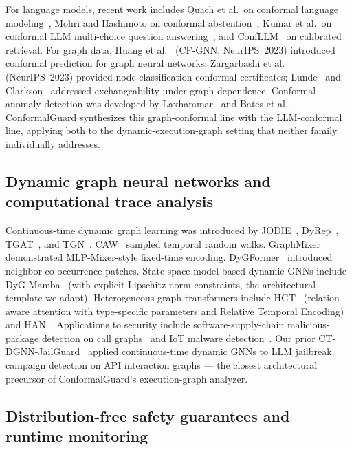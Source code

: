 \documentclass[12pt,a4paper]{article}
\theoremstyle{definition}
\theoremstyle{remark}
\newcommand{\modelname}{ConformalGuard}
\begin{document}
For language models, recent work includes Quach et al.\ on conformal language modeling~\cite{quach2024conformal}, Mohri and Hashimoto on conformal abstention~\cite{mohri2024conformal}, Kumar et al.\ on conformal LLM multi-choice question answering~\cite{kumar2023conformal}, and ConfLLM~\cite{huang2024confllm} on calibrated retrieval. For graph data, Huang et al.~\cite{huang2023cfgnn} (CF-GNN, NeurIPS~2023) introduced conformal prediction for graph neural networks; Zargarbashi et al.~\cite{zargarbashi2023conformal} (NeurIPS~2023) provided node-classification conformal certificates; Lunde~\cite{lunde2023conformal} and Clarkson~\cite{clarkson2023distribution} addressed exchangeability under graph dependence. Conformal anomaly detection was developed by Laxhammar~\cite{laxhammar2014conformal} and Bates et al.~\cite{bates2023testing}. \modelname{} synthesizes this graph-conformal line with the LLM-conformal line, applying both to the dynamic-execution-graph setting that neither family individually addresses.

\subsection{Dynamic graph neural networks and computational trace analysis}

Continuous-time dynamic graph learning was introduced by JODIE~\cite{kumar2019jodie}, DyRep~\cite{trivedi2019dyrep}, TGAT~\cite{xu2020tgat}, and TGN~\cite{rossi2020tgn}. CAW~\cite{wang2021caw} sampled temporal random walks. GraphMixer~\cite{cong2023graphmixer} demonstrated MLP-Mixer-style fixed-time encoding. DyGFormer~\cite{yu2023dygformer} introduced neighbor co-occurrence patches. State-space-model-based dynamic GNNs include DyG-Mamba~\cite{li2025dygmamba} (with explicit Lipschitz-norm constraints, the architectural template we adapt). Heterogeneous graph transformers include HGT~\cite{hu2020hgt} (relation-aware attention with type-specific parameters and Relative Temporal Encoding) and HAN~\cite{wang2019han}. Applications to security include software-supply-chain malicious-package detection on call graphs~\cite{sejfia2022amalfi,zhang2024spiderscan} and IoT malware detection~\cite{amjath2025fedmalgnn}. Our prior CT-DGNN-JailGuard~\cite{anaedevha2026robustidps} applied continuous-time dynamic GNNs to LLM jailbreak campaign detection on API interaction graphs --- the closest architectural precursor of \modelname{}'s execution-graph analyzer.

\subsection{Distribution-free safety guarantees and runtime monitoring}
\end{document}
